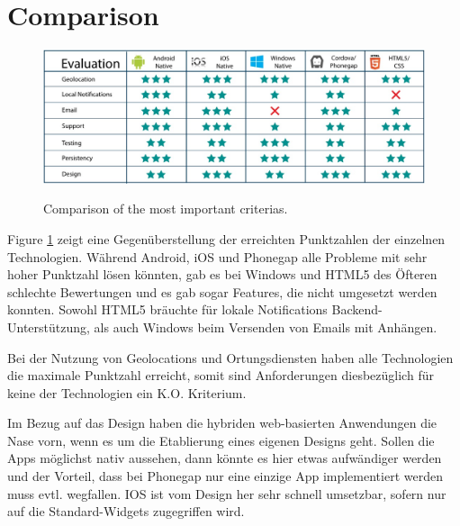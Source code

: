 \section{Comparison}

\begin{figure}[b!]
\caption{Comparison of the most important criterias.}
\centering
\includegraphics[scale=0.4]{resources/comparison.jpg}
\label{comparison}
\end{figure}

Figure \ref{comparison} zeigt eine Gegenüberstellung der erreichten Punktzahlen der einzelnen Technologien. Während Android, iOS und Phonegap alle Probleme mit sehr hoher Punktzahl lösen könnten, gab es bei Windows und HTML5 des Öfteren schlechte Bewertungen und es gab sogar Features, die nicht umgesetzt werden konnten. Sowohl HTML5 bräuchte für lokale Notifications Backend-Unterstützung, als auch Windows beim Versenden von Emails mit Anhängen.

Bei der Nutzung von Geolocations und Ortungsdiensten haben alle Technologien die maximale Punktzahl erreicht, somit sind Anforderungen diesbezüglich für keine der Technologien ein K.O. Kriterium.

Im Bezug auf das Design haben die hybriden web-basierten Anwendungen die Nase vorn, wenn es um die Etablierung eines eigenen Designs geht. Sollen die Apps möglichst nativ aussehen, dann könnte es hier etwas aufwändiger werden und der Vorteil, dass bei Phonegap nur eine einzige App implementiert werden muss evtl. wegfallen. IOS ist vom Design her sehr schnell umsetzbar, sofern nur auf die Standard-Widgets zugegriffen wird. 

